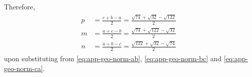 	Therefore,
\begin{align}
\begin{split}
    p&=\frac{c+b-a}{2}
    =\frac{\sqrt{74}+\sqrt{32}-\sqrt{122}}{2}
    \\
    m&=\frac{a+c-b}{2}
    =\frac{\sqrt{74}+\sqrt{122}-\sqrt{32}}{2}
    \\
    n&=\frac{a+b-c}{2}
    =\frac{\sqrt{122}+\sqrt{32}-\sqrt{74}}{2}
\end{split}
	\label{eq:incircle-mnp}
\end{align}
upon substituting from 
		\eqref{eq:app-geo-norm-ab},
		\eqref{eq:app-geo-norm-bc}
		and
		\eqref{eq:app-geo-norm-ca}.
	\fi

